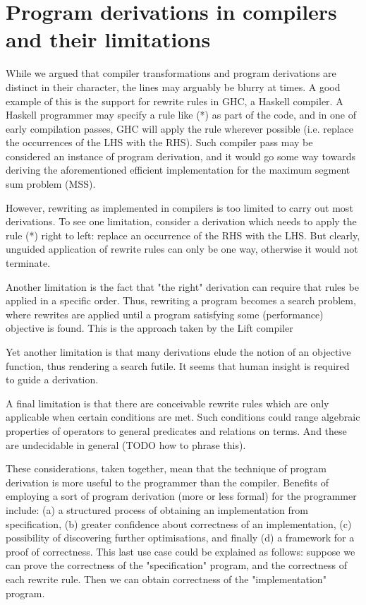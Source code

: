\documentclass[bsc,frontabs,twoside,singlespacing,parskip,deptreport]{infthesis}
\theoremstyle{definition}
\begin{document}
\section{Program derivations in compilers and their limitations}
\label{sec:progr-deriv-comp}

While we argued that compiler transformations and program derivations
are distinct in their character, the lines may arguably be blurry at
times. A good example of this is the support for rewrite rules in GHC,
a Haskell compiler. A Haskell programmer may specify a rule like (*)
as part of the code, and in one of early compilation passes, GHC will
apply the rule wherever possible (i.e. replace the occurrences of the
LHS with the RHS). Such compiler pass may be considered an instance of
program derivation, and it would go some way towards deriving the
aforementioned efficient implementation for the maximum segment sum
problem (MSS).

However, rewriting as implemented in compilers is too limited to carry
out most derivations. To see one limitation, consider a derivation
which needs to apply the rule (*) right to left: replace an occurrence
of the RHS with the LHS. But clearly, unguided application of rewrite
rules can only be one way, otherwise it would not terminate.

Another limitation is the fact that "the right" derivation can require
that rules be applied in a specific order. Thus, rewriting a program
becomes a search problem, where rewrites are applied until a program
satisfying some (performance) objective is found. This is the approach
taken by the Lift compiler \cite{TODO}

Yet another limitation is that many derivations elude the notion of an
objective function, thus rendering a search futile. It seems that
human insight is required to guide a derivation.

A final limitation is that there are conceivable rewrite rules which
are only applicable when certain conditions are met. Such conditions
could range algebraic properties of operators to general predicates
and relations on terms. And these are undecidable in general (TODO how
to phrase this).

These considerations, taken together, mean that the technique of
program derivation is more useful to the programmer than the
compiler. Benefits of employing a sort of program derivation (more or
less formal) for the programmer include: (a) a structured process of
obtaining an implementation from specification, (b) greater confidence
about correctness of an implementation, (c) possibility of discovering
further optimisations, and finally (d) a framework for a proof of
correctness. This last use case could be explained as follows: suppose
we can prove the correctness of the "specification" program, and the
correctness of each rewrite rule. Then we can obtain correctness of
the "implementation" program.
\end{document}
